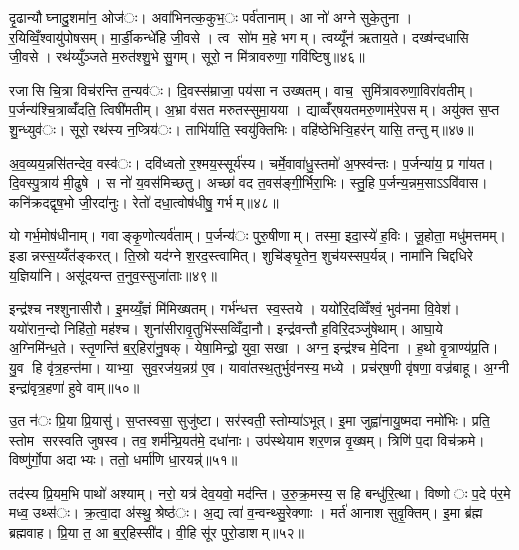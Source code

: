 दृ॒ढान्यौघ्नादु॒शमा॑न॒ ओज॑ः। अवा॑भिनत्क॒कुभ॒ः पर्व॑तानाम्। आ नो॑ अग्ने सुके॒तुना। र॒यिव्विँ॒श्वायु॑पोषसम्। मा॒र्डी॒कन्धे॑हि जी॒वसे। त्व सो॑म म॒हे भगम्। त्वय्यूँन॑ ऋताय॒ते। दख्ष॑न्दधासि जी॒वसे। रथ॑य्युँञ्जते म॒रुत॑श्शु॒भे सु॒गम्। सूरो॒ न मि॑त्रावरुणा॒ गवि॑ष्टिषु॥४६॥

रजासि चि॒त्रा विच॑रन्ति त॒न्यव॑ः। दि॒वस्स॑म्राजा॒ पय॑सा न उख्षतम्। वाच॒ सुमि॑त्रावरुणा॒विरा॑वतीम्। प॒र्जन्य॑श्चि॒त्राव्वँ॑दति॒ त्विषी॑मतीम्। अ॒भ्रा व॑सत मरुतस्सुमा॒यया। द्याव्वँ॑र्‌षयतमरु॒णाम॑रे॒पसम्। अयु॑क्त स॒प्त शु॒न्ध्युव॑ः। सूरो॒ रथ॑स्य न॒प्त्रिय॑ः। ताभि॑र्याति॒ स्वयु॑क्तिभिः। वहि॑ष्ठेभिऱ्वि॒हर॑न् यासि॒ तन्तुम्॥४७॥

अ॒व॒व्यय॒न्नसि॑तन्देव॒ वस्व॑ः। दवि॑ध्वतो र॒श्मय॒स्सूर्य॑स्य। चर्मे॒वावा॑धु॒स्तमो॑ अ॒फ्स्व॑न्तः। प॒र्जन्या॑य॒ प्र गा॑यत। दि॒वस्पु॒त्राय॑ मी॒ढुषे। स नो॑ य॒वस॑मिच्छतु। अच्छा॑ वद त॒वस॑ङ्गी॒र्भिरा॒भिः। स्तु॒हि प॒र्जन्य॒न्नम॒साऽऽवि॑वास। कनि॑क्रदद्वृष॒भो जी॒रदा॑नुः। रेतो॑ दधा॒त्वोष॑धीषु॒ गर्भम्॥४८॥

यो गर्भ॒मोष॑धीनाम्। गवाङ्कृ॒णोत्यर्व॑ताम्। प॒र्जन्य॑ः पुरु॒षीणाम्। तस्मा॒ इदा॒स्ये॑ ह॒विः। जू॒होता॒ मधु॑मत्तमम्। इडान्नस्स॒य्यँत॑ङ्करत्। ति॒स्रो यद॑ग्ने श॒रद॒स्त्वामित्। शुचि॑ङ्घृ॒तेन॒ शुच॑यस्सप॒र्यन्न्। नामा॑नि चिद्दधिरे य॒ज्ञिया॑नि। असू॑दयन्त त॒नुव॒स्सुजा॑ताः॥४९॥

इन्द्र॑श्च नश्शुनासीरौ। इ॒मय्यँ॒ज्ञं मि॑मिख्षतम्। गर्भ॑न्धत्त स्व॒स्तये। ययो॑रि॒दव्विँश्वं॒ भुव॑नमा वि॒वेश॑। ययो॑रान॒न्दो निहि॑तो॒ मह॑श्च। शुना॑सीरावृ॒तुभि॑स्सव्विँदा॒नौ। इन्द्र॑वन्तौ ह॒विरि॒दञ्जु॑षेथाम्। आघा॒ये अ॒ग्निमि॑न्ध॒ते। स्तृ॒णन्ति॑ ब॒र्॒हिरा॑नु॒षक्। येषा॒मिन्द्रो॒ युवा॒ सखा। अग्न॒ इन्द्र॑श्च मे॒दिना। ह॒थो वृ॒त्राण्य॑प्र॒ति। यु॒व हि वृ॑त्र॒हन्त॑मा। याभ्या॒ सुव॒रज॑य॒न्नग्र॑ ए॒व। यावा॑तस्थ॒तुर्भुव॑नस्य॒ मध्ये। प्रच॑र्‌ष॒णी वृ॑षणा॒ वज्र॑बाहू। अ॒ग्नी इन्द्रा॑वृत्र॒हणा॑ हुवे वाम्॥५०॥


उ॒त न॑ः प्रि॒या प्रि॒यासु॑। स॒प्तस्वसा॒ सुजु॑ष्टा। सर॑स्वती॒ स्तोम्या॑ऽभूत्। इ॒मा जुह्वा॑नायु॒ष्मदा नमो॑भिः। प्रति॒ स्तोम सरस्वति जुषस्व। तव॒ शर्म॑न्प्रि॒यत॑मे॒ दधा॑नाः। उप॑स्थेयाम शर॒णन्न वृ॒ख्षम्। त्रिणि॑ प॒दा विच॑क्रमे। विष्णु॑र्गो॒पा अदाभ्यः। ततो॒ धर्मा॑णि धा॒रयन्न्॑॥५१॥

तद॑स्य प्रि॒यम॒भि पाथो॑ अश्याम्। नरो॒ यत्र॑ देव॒यवो॒ मद॑न्ति। उ॒रु॒क्र॒मस्य॒ स हि बन्धु॑रि॒त्था। विष्णोः प॒दे प॑र॒मे मध्व॒ उथ्स॑ः। क्र॒त्वा॒दा अ॑स्थु॒ श्रेष्ठ॑ः। अ॒द्य त्वा॑ व॒न्वन्थ्सु॒रेक्णाः। मर्त॑ आनाश सुवृ॒क्तिम्। इ॒मा ब्र॑ह्म ब्रह्मवाह। प्रि॒या त॒ आ ब॒र्॒हिस्सी॑द। वी॒हि सू॑र पुरो॒डाशम्॥५२॥

